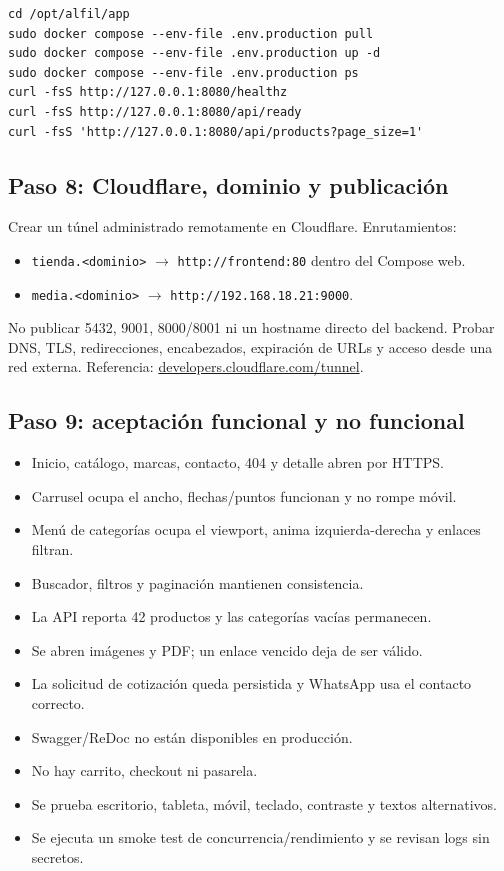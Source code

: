 \documentclass[11pt,a4paper]{article}
\newcommand{\code}[1]{\nolinkurl{#1}}
\begin{document}
\begin{lstlisting}
cd /opt/alfil/app
sudo docker compose --env-file .env.production pull
sudo docker compose --env-file .env.production up -d
sudo docker compose --env-file .env.production ps
curl -fsS http://127.0.0.1:8080/healthz
curl -fsS http://127.0.0.1:8080/api/ready
curl -fsS 'http://127.0.0.1:8080/api/products?page_size=1'
\end{lstlisting}

\subsection{Paso 8: Cloudflare, dominio y publicación}

Crear un túnel administrado remotamente en Cloudflare. Enrutamientos:

\begin{itemize}
  \item \code{tienda.<dominio>} $\rightarrow$ \code{http://frontend:80} dentro del Compose web.
  \item \code{media.<dominio>} $\rightarrow$ \code{http://192.168.18.21:9000}.
\end{itemize}

No publicar 5432, 9001, 8000/8001 ni un hostname directo del backend. Probar DNS, TLS, redirecciones, encabezados, expiración de URLs y acceso desde una red externa. Referencia: \href{https://developers.cloudflare.com/tunnel/}{developers.cloudflare.com/tunnel}.

\subsection{Paso 9: aceptación funcional y no funcional}

\begin{itemize}
  \item Inicio, catálogo, marcas, contacto, 404 y detalle abren por HTTPS.
  \item Carrusel ocupa el ancho, flechas/puntos funcionan y no rompe móvil.
  \item Menú de categorías ocupa el viewport, anima izquierda-derecha y enlaces filtran.
  \item Buscador, filtros y paginación mantienen consistencia.
  \item La API reporta 42 productos y las categorías vacías permanecen.
  \item Se abren imágenes y PDF; un enlace vencido deja de ser válido.
  \item La solicitud de cotización queda persistida y WhatsApp usa el contacto correcto.
  \item Swagger/ReDoc no están disponibles en producción.
  \item No hay carrito, checkout ni pasarela.
  \item Se prueba escritorio, tableta, móvil, teclado, contraste y textos alternativos.
  \item Se ejecuta un smoke test de concurrencia/rendimiento y se revisan logs sin secretos.
\end{itemize}
\end{document}

